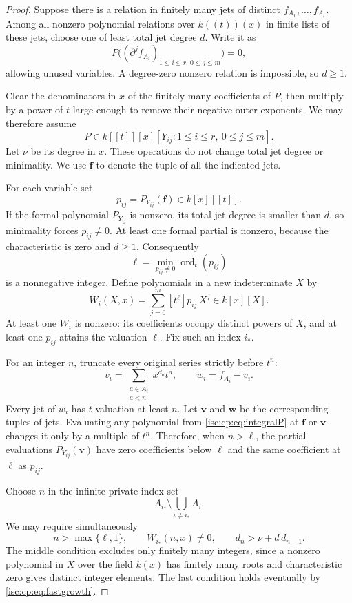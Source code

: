 \documentclass[11pt,letterpaper]{article}
\theoremstyle{definition}
\theoremstyle{remark}
\newcommand{\ordt}{\operatorname{ord}_t}
\numberwithin{equation}{section}
\begin{document}
\begin{proof}
Suppose there is a relation in finitely many jets of distinct
$f_{A_1},\ldots,f_{A_r}$. Among all nonzero polynomial relations over
$k((t))(x)$ in finite lists of these jets, choose one of least total jet
degree $d$. Write it as
\[
 P\bigl((\partial^j f_{A_i})_{1\le i\le r,\,0\le j\le m}\bigr)=0,
\]
allowing unused variables. A degree-zero nonzero relation is impossible, so
$d\ge1$.

Clear the denominators in $x$ of the finitely many coefficients of $P$,
then multiply by a power of $t$ large enough to remove their negative outer
exponents. We may therefore assume
\begin{equation}\label{isc:cp:eq:integralP}
 P\in k[[t]][x][Y_{ij}:1\le i\le r,\ 0\le j\le m].
\end{equation}
Let $\nu$ be its degree in $x$. These operations do not change total jet
degree or minimality. We use $\mathbf f$ to denote the tuple of all the
indicated jets.

For each variable set
\[
 p_{ij}=P_{Y_{ij}}(\mathbf f)\in k[x][[t]].
\]
If the formal polynomial $P_{Y_{ij}}$ is nonzero, its total jet degree is
smaller than $d$, so minimality forces $p_{ij}\ne0$. At least one formal
partial is nonzero, because the characteristic is zero and $d\ge1$.
Consequently
\[
 \ell=\min_{p_{ij}\ne0}\ordt(p_{ij})
\]
is a nonnegative integer. Define polynomials in a new indeterminate $X$ by
\begin{equation}\label{isc:cp:eq:Hpolynomial}
 W_i(X,x)=\sum_{j=0}^m [t^\ell]p_{ij}\,X^j\in k[x][X].
\end{equation}
At least one $W_i$ is nonzero: its coefficients occupy distinct powers of
$X$, and at least one $p_{ij}$ attains the valuation $\ell$. Fix such an
index $i_*$.

For an integer $n$, truncate every original series strictly before $t^n$:
\[
 v_i=\sum_{\substack{a\in A_i\\a<n}}x^{d_a}t^a,
 \qquad w_i=f_{A_i}-v_i.
\]
Every jet of $w_i$ has $t$-valuation at least $n$. Let $\mathbf v$ and
$\mathbf w$ be the corresponding tuples of jets. Evaluating any polynomial
from \eqref{isc:cp:eq:integralP} at $\mathbf f$ or $\mathbf v$ changes it only
by a multiple of $t^n$. Therefore, when $n>\ell$, the partial evaluations
$P_{Y_{ij}}(\mathbf v)$ have zero coefficients below $\ell$ and the same
coefficient at $\ell$ as $p_{ij}$.

Choose $n$ in the infinite private-index set
\[
 A_{i_*}\setminus\bigcup_{i\ne i_*}A_i.
\]
We may require simultaneously
\begin{equation}\label{isc:cp:eq:nchoices}
 n>\max\{\ell,1\},\qquad W_{i_*}(n,x)\ne0,\qquad
 d_n>\nu+d\,d_{n-1}.
\end{equation}
The middle condition excludes only finitely many integers, since a nonzero
polynomial in $X$ over the field $k(x)$ has finitely many roots and
characteristic zero gives distinct integer elements. The last condition
holds eventually by \eqref{isc:cp:eq:fastgrowth}.


\end{proof}
\end{document}
